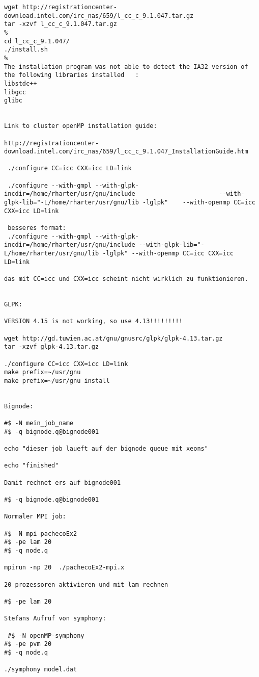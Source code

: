 \begin{verbatim}
wget http://registrationcenter-download.intel.com/irc_nas/659/l_cc_c_9.1.047.tar.gz
tar -xzvf l_cc_c_9.1.047.tar.gz
%
cd l_cc_c_9.1.047/
./install.sh
%
The installation program was not able to detect the IA32 version of the following libraries installed   :
libstdc++
libgcc
glibc


Link to cluster openMP installation guide:

http://registrationcenter-download.intel.com/irc_nas/659/l_cc_c_9.1.047_InstallationGuide.htm

 ./configure CC=icc CXX=icc LD=link
 
 ./configure --with-gmpl --with-glpk-incdir=/home/rharter/usr/gnu/include 						--with-glpk-lib="-L/home/rharter/usr/gnu/lib -lglpk"	--with-openmp CC=icc CXX=icc LD=link
 
 besseres format: 
 ./configure --with-gmpl --with-glpk-incdir=/home/rharter/usr/gnu/include --with-glpk-lib="-L/home/rharter/usr/gnu/lib -lglpk" --with-openmp CC=icc CXX=icc LD=link

das mit CC=icc und CXX=icc scheint nicht wirklich zu funktionieren.


GLPK:

VERSION 4.15 is not working, so use 4.13!!!!!!!!!

wget http://gd.tuwien.ac.at/gnu/gnusrc/glpk/glpk-4.13.tar.gz
tar -xzvf glpk-4.13.tar.gz

./configure CC=icc CXX=icc LD=link
make prefix=~/usr/gnu
make prefix=~/usr/gnu install


Bignode:

#$ -N mein_job_name
#$ -q bignode.q@bignode001

echo "dieser job laueft auf der bignode queue mit xeons"

echo "finished"

Damit rechnet ers auf bignode001

#$ -q bignode.q@bignode001

Normaler MPI job:

#$ -N mpi-pachecoEx2
#$ -pe lam 20
#$ -q node.q

mpirun -np 20  ./pachecoEx2-mpi.x

20 prozessoren aktivieren und mit lam rechnen

#$ -pe lam 20

Stefans Aufruf von symphony:

 #$ -N openMP-symphony
#$ -pe pvm 20
#$ -q node.q

./symphony model.dat

\end{verbatim}
